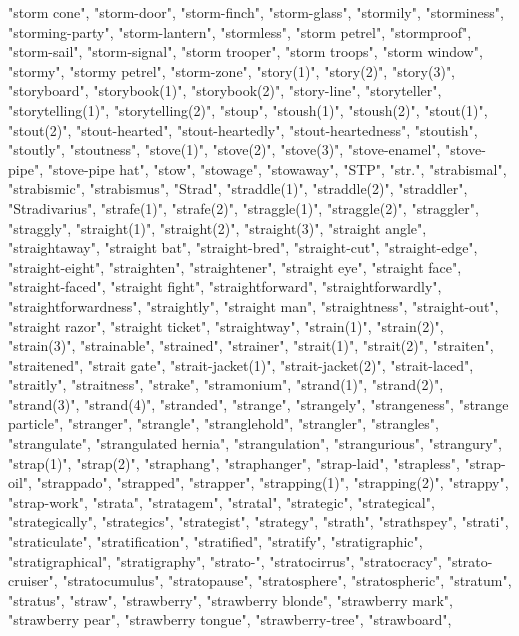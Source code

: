 "storm cone",
"storm-door",
"storm-finch",
"storm-glass",
"stormily",
"storminess",
"storming-party",
"storm-lantern",
"stormless",
"storm petrel",
"stormproof",
"storm-sail",
"storm-signal",
"storm trooper",
"storm troops",
"storm window",
"stormy",
"stormy petrel",
"storm-zone",
"story(1)",
"story(2)",
"story(3)",
"storyboard",
"storybook(1)",
"storybook(2)",
"story-line",
"storyteller",
"storytelling(1)",
"storytelling(2)",
"stoup",
"stoush(1)",
"stoush(2)",
"stout(1)",
"stout(2)",
"stout-hearted",
"stout-heartedly",
"stout-heartedness",
"stoutish",
"stoutly",
"stoutness",
"stove(1)",
"stove(2)",
"stove(3)",
"stove-enamel",
"stove-pipe",
"stove-pipe hat",
"stow",
"stowage",
"stowaway",
"STP",
"str.",
"strabismal",
"strabismic",
"strabismus",
"Strad",
"straddle(1)",
"straddle(2)",
"straddler",
"Stradivarius",
"strafe(1)",
"strafe(2)",
"straggle(1)",
"straggle(2)",
"straggler",
"straggly",
"straight(1)",
"straight(2)",
"straight(3)",
"straight angle",
"straightaway",
"straight bat",
"straight-bred",
"straight-cut",
"straight-edge",
"straight-eight",
"straighten",
"straightener",
"straight eye",
"straight face",
"straight-faced",
"straight fight",
"straightforward",
"straightforwardly",
"straightforwardness",
"straightly",
"straight man",
"straightness",
"straight-out",
"straight razor",
"straight ticket",
"straightway",
"strain(1)",
"strain(2)",
"strain(3)",
"strainable",
"strained",
"strainer",
"strait(1)",
"strait(2)",
"straiten",
"straitened",
"strait gate",
"strait-jacket(1)",
"strait-jacket(2)",
"strait-laced",
"straitly",
"straitness",
"strake",
"stramonium",
"strand(1)",
"strand(2)",
"strand(3)",
"strand(4)",
"stranded",
"strange",
"strangely",
"strangeness",
"strange particle",
"stranger",
"strangle",
"stranglehold",
"strangler",
"strangles",
"strangulate",
"strangulated hernia",
"strangulation",
"strangurious",
"strangury",
"strap(1)",
"strap(2)",
"straphang",
"straphanger",
"strap-laid",
"strapless",
"strap-oil",
"strappado",
"strapped",
"strapper",
"strapping(1)",
"strapping(2)",
"strappy",
"strap-work",
"strata",
"stratagem",
"stratal",
"strategic",
"strategical",
"strategically",
"strategics",
"strategist",
"strategy",
"strath",
"strathspey",
"strati",
"straticulate",
"stratification",
"stratified",
"stratify",
"stratigraphic",
"stratigraphical",
"stratigraphy",
"strato-",
"stratocirrus",
"stratocracy",
"strato-cruiser",
"stratocumulus",
"stratopause",
"stratosphere",
"stratospheric",
"stratum",
"stratus",
"straw",
"strawberry",
"strawberry blonde",
"strawberry mark",
"strawberry pear",
"strawberry tongue",
"strawberry-tree",
"strawboard",
